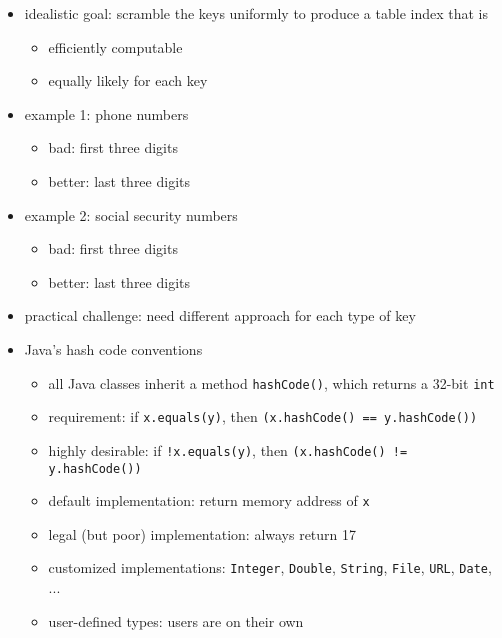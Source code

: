 \documentclass[8pt,a4paper,compress]{beamer}
\begin{document}
\begin{frame}[fragile]
\begin{itemize}
\item idealistic goal: scramble the keys uniformly to produce a table index that is
\begin{itemize}
\item efficiently computable

\item equally likely for each key
\end{itemize}

\item example 1: phone numbers
\begin{itemize}
\item bad: first three digits

\item better: last three digits
\end{itemize}

\item example 2: social security numbers
\begin{itemize}
\item bad: first three digits

\item better: last three digits
\end{itemize}

\item practical challenge: need different approach for each type of key
\end{itemize}
\end{frame}

\begin{frame}[fragile]
\begin{itemize}
\item Java's hash code conventions
\begin{itemize}
\item all Java classes inherit a method \lstinline{hashCode()}, which returns a 32-bit \lstinline{int}

\item requirement: if \lstinline{x.equals(y)}, then \lstinline{(x.hashCode() == y.hashCode())}

\item highly desirable: if \lstinline{!x.equals(y)}, then \lstinline{(x.hashCode() != y.hashCode())}

\item default implementation: return memory address of \lstinline{x}

\item legal (but poor) implementation: always return 17

\item customized implementations: \lstinline{Integer}, \lstinline{Double}, \lstinline{String}, \lstinline{File}, \lstinline{URL}, \lstinline{Date}, ...

\item user-defined types: users are on their own
\end{itemize}
\end{itemize}
\end{frame}
\end{document}
